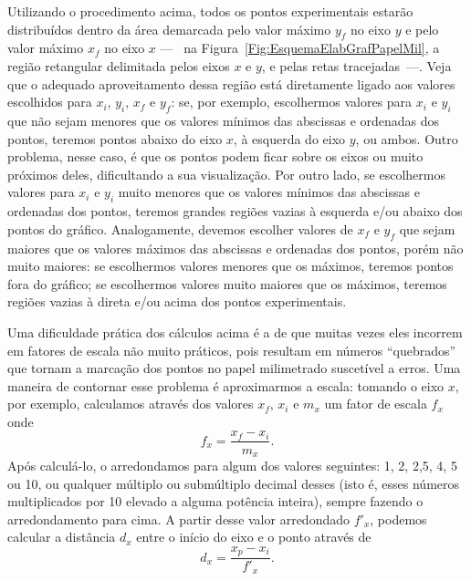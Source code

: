 Utilizando o procedimento acima, todos os pontos experimentais estarão distribuídos dentro da área demarcada pelo valor máximo $y_f$ no eixo $y$ e pelo valor máximo $x_f$ no eixo $x$ ---~ na Figura~\ref{Fig:EsquemaElabGrafPapelMil}, a região retangular delimitada pelos eixos $x$ e $y$, e pelas retas tracejadas~---. Veja que o adequado aproveitamento dessa região está diretamente ligado aos valores escolhidos para $x_i$, $y_i$, $x_f$ e $y_f$: se, por exemplo, escolhermos valores para $x_i$ e $y_i$ que não sejam menores que os valores mínimos das abscissas e ordenadas dos pontos, teremos pontos abaixo do eixo $x$, à esquerda do eixo $y$, ou ambos. Outro problema, nesse caso, é que os pontos podem ficar sobre os eixos ou muito próximos deles, dificultando a sua visualização. Por outro lado, se escolhermos valores para $x_i$ e $y_i$ muito menores que os valores mínimos das abscissas e ordenadas dos pontos, teremos grandes regiões vazias à esquerda e/ou abaixo dos pontos do gráfico. Analogamente, devemos escolher valores de $x_f$ e $y_f$ que sejam maiores que os valores máximos das abscissas e ordenadas dos pontos, porém não muito maiores: se escolhermos valores menores que os máximos, teremos pontos fora do gráfico; se escolhermos valores muito maiores que os máximos, teremos regiões vazias à direta e/ou acima dos pontos experimentais. 

Uma dificuldade prática dos cálculos acima é a de que muitas vezes eles incorrem em fatores de escala não muito práticos, pois resultam em números ``quebrados'' que tornam a marcação dos pontos no papel milimetrado suscetível a erros. Uma maneira de contornar esse problema é aproximarmos a escala: tomando o eixo $x$, por exemplo, calculamos através dos valores $x_f$, $x_i$ e $m_x$ um fator de escala $f_x$ onde
		\begin{equation}
			f_x = \frac{x_f - x_i}{m_x}.
		\end{equation}
Após calculá-lo, o arredondamos para algum dos valores seguintes: 1, 2, 2,5, 4, 5 ou 10, ou qualquer múltiplo ou submúltiplo decimal desses (isto é, esses números multiplicados por 10 elevado a alguma potência inteira), sempre fazendo o arredondamento para cima. A partir desse valor arredondado $f'_x$, podemos calcular a distância $d_x$ entre o início do eixo e o ponto através de
		\begin{equation}
			d_x = \frac{x_p - x_i}{f'_x}.
		\end{equation}

